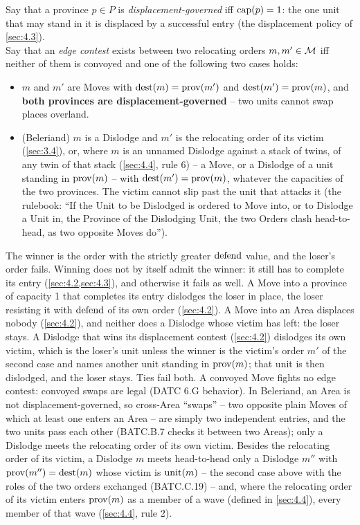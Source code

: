 \documentclass[12pt,a4paper]{article}
\begin{document}
Say that a province $p \in P$ is \emph{displacement-governed} iff $\operatorname{cap}(p) = 1$: the one unit that may stand in it is displaced by a successful entry (the displacement policy of \cref{sec:4.3}).\\
Say that an \emph{edge contest} exists between two relocating orders $m, m' \in \mathcal{M}$ iff neither of them is convoyed and one of the following two cases holds:
\begin{itemize}
\item $m$ and $m'$ are Moves with $\operatorname{dest}(m) = \operatorname{prov}(m')$ and $\operatorname{dest}(m') = \operatorname{prov}(m)$, and \textbf{both provinces are displacement-governed} -- two units cannot swap places overland.
\item (Beleriand) $m$ is a Dislodge and $m'$ is the relocating order of its victim (\cref{sec:3.4}), or, where $m$ is an unnamed Dislodge against a stack of twins, of any twin of that stack (\cref{sec:4.4}, rule 6) -- a Move, or a Dislodge of a unit standing in $\operatorname{prov}(m)$ -- with $\operatorname{dest}(m') = \operatorname{prov}(m)$, whatever the capacities of the two provinces.
The victim cannot slip past the unit that attacks it (the rulebook: ``If the Unit to be Dislodged is ordered to Move into, or to Dislodge a Unit in, the Province of the Dislodging Unit, the two Orders clash head-to-head, as two opposite Moves do'').
\end{itemize}
The winner is the order with the strictly greater $\operatorname{defend}$ value, and the loser's order fails.
Winning does not by itself admit the winner: it still has to complete its entry (\cref{sec:4.2,sec:4.3}), and otherwise it fails as well.
A Move into a province of capacity 1 that completes its entry dislodges the loser in place, the loser resisting it with $\operatorname{defend}$ of its own order (\cref{sec:4.2}).
A Move into an Area displaces nobody (\cref{sec:4.2}), and neither does a Dislodge whose victim has left: the loser stays.
A Dislodge that wins its displacement contest (\cref{sec:4.2}) dislodges its own victim, which is the loser's unit unless the winner is the victim's order $m'$ of the second case and names another unit standing in $\operatorname{prov}(m)$; that unit is then dislodged, and the loser stays.
Ties fail both.
A convoyed Move fights no edge contest: convoyed swaps are legal (DATC 6.G behavior).
In Beleriand, an Area is not displacement-governed, so cross-Area ``swaps'' -- two opposite plain Moves of which at least one enters an Area -- are simply two independent entries, and the two units pass each other (BATC.B.7 checks it between two Areas); only a Dislodge meets the relocating order of its own victim.
Besides the relocating order of its victim, a Dislodge $m$ meets head-to-head only a Dislodge $m''$ with $\operatorname{prov}(m'') = \operatorname{dest}(m)$ whose victim is $\operatorname{unit}(m)$ -- the second case above with the roles of the two orders exchanged (BATC.C.19) -- and, where the relocating order of its victim enters $\operatorname{prov}(m)$ as a member of a wave (defined in \cref{sec:4.4}), every member of that wave (\cref{sec:4.4}, rule 2).
\end{document}
